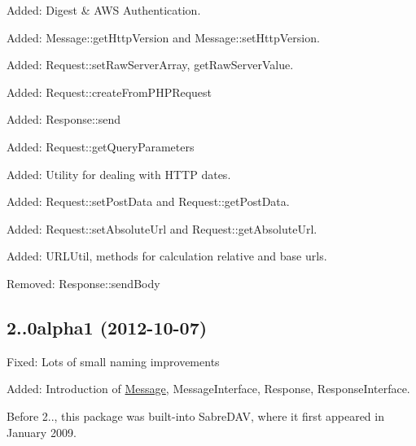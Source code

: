 \begin{DoxyItemize}
\item Added\+: Digest \& A\+WS Authentication.
\item Added\+: Message\+::get\+Http\+Version and Message\+::set\+Http\+Version.
\item Added\+: Request\+::set\+Raw\+Server\+Array, get\+Raw\+Server\+Value.
\item Added\+: Request\+::create\+From\+P\+H\+P\+Request
\item Added\+: Response\+::send
\item Added\+: Request\+::get\+Query\+Parameters
\item Added\+: Utility for dealing with H\+T\+TP dates.
\item Added\+: Request\+::set\+Post\+Data and Request\+::get\+Post\+Data.
\item Added\+: Request\+::set\+Absolute\+Url and Request\+::get\+Absolute\+Url.
\item Added\+: U\+R\+L\+Util, methods for calculation relative and base urls.
\item Removed\+: Response\+::send\+Body
\end{DoxyItemize}

\subsection*{2..\+0alpha1 (2012-\/10-\/07) }


\begin{DoxyItemize}
\item Fixed\+: Lots of small naming improvements
\item Added\+: Introduction of \mbox{\hyperlink{class_message}{Message}}, Message\+Interface, Response, Response\+Interface.
\end{DoxyItemize}

Before 2.., this package was built-\/into Sabre\+D\+AV, where it first appeared in January 2009. 